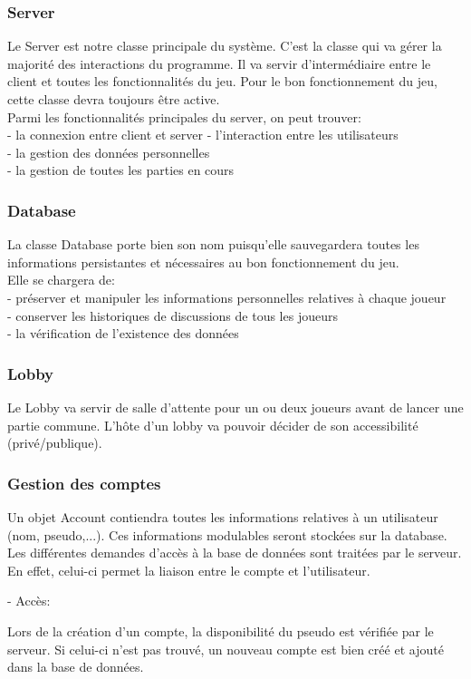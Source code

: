 \documentclass[a4paper,12pt]{article}
\begin{document}
\subsubsection{Server}
Le Server est notre classe principale du système. C'est la classe qui va gérer la majorité des interactions du programme. Il va servir d'intermédiaire entre le client et toutes les fonctionnalités du jeu. Pour le bon fonctionnement du jeu, cette classe devra toujours être active.\\
Parmi les fonctionnalités principales du server, on peut trouver:\\
- la connexion entre client et server
- l'interaction entre les utilisateurs\\
- la gestion des données personnelles\\
- la gestion de toutes les parties en cours
\subsubsection{Database}
La classe Database porte bien son nom puisqu'elle sauvegardera toutes les informations persistantes et nécessaires au bon fonctionnement du jeu.\\
Elle se chargera de:\\
- préserver et manipuler les informations personnelles relatives à chaque joueur\\
- conserver les historiques de discussions de tous les joueurs\\
- la vérification de l'existence des données
\subsubsection{Lobby}
Le Lobby va servir de salle d'attente pour un ou deux joueurs avant de lancer une partie commune. L'hôte d'un lobby va pouvoir décider de son accessibilité (privé/publique).

\subsubsection{Gestion des comptes}
Un objet Account contiendra toutes les informations relatives à un utilisateur (nom, pseudo,...). Ces informations modulables seront stockées sur la database.
 Les différentes demandes d'accès à la base de données sont traitées par le serveur. En effet, celui-ci permet la liaison entre le compte et l'utilisateur.

- Accès:

Lors de la création d'un compte, la disponibilité du pseudo est vérifiée par le serveur. Si celui-ci n'est pas trouvé, un nouveau compte est bien créé et ajouté dans la base de données.
\end{document}
